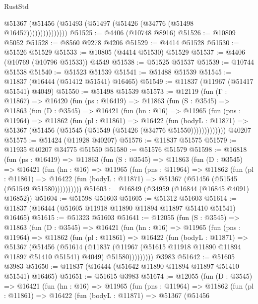 \begin{lexlean}{RustStd}
\begin{coremodule}
{\begin{coremodule}
{{{{{{{{{{{{{{{{{{{{{{{{{{{{{{{{{{{{{{{{{{{{{{{{{{                    @51367 (@51456 (@51493 (@51497 (@51426 (@34776 (@51498 @16457)))))))))))))))
@51525 := @4406 (@10748 @8916)
@51526 := @10809 @5052
@51528 := @8560 @9278 @4206
@51529 := @4414 @51528
@51530 := @51526 @51529
@51533 := @10805 (@4414 @51530) @51529
@51537 := @4406 (@10769 (@10796 @51533)) @4549
@51538 := @51525 @51537
@51539 := @10744 @51538
@51540 := @51523 @51539
@51541 := @51488 @51539
@51545 := @11837 (@16444 (@51412 @51541) @16465)
@51549 := @11837 (@11967 (@51417 @51541) @4049)
@51550 := @51498 @51539
@51573 := @12119
    (fun (Γ : @11867) =>
    @16420
      (fun (ps : @16419) =>
      @11863
        (fun (S : @3545) =>
        @11863
          (fun (D : @3545) =>
          @16421
            (fun (hn : @16) =>
            @11965
              (fun (pns : @11964) =>
              @11862
                (fun (pl : @11861) =>
                @16422
                  (fun (bodyL : @11871) =>
                  @51367 (@51456 (@51545 (@51549 (@51426 (@34776 @51550)))))))))))))
    @40207
@51575 := @51424 (@11928 @40207)
@51576 := @11837 @51575
@51579 := @11935 @40207 @34775 @51550
@51580 := @51576 @51579
@51598 := @16818
    (fun (ps : @16419) =>
    @11863
      (fun (S : @3545) =>
      @11863
        (fun (D : @3545) =>
        @16421
          (fun (hn : @16) =>
          @11965
            (fun (pns : @11964) =>
            @11862
              (fun (pl : @11861) =>
              @16422 (fun (bodyL : @11871) => @51367 (@51456 (@51545 (@51549 @51580))))))))))
@51603 := @16849 (@34959 (@16844 (@16845 @4091) @16852))
@51604 := @51598 @51603
@51605 := @51312 @51603
@51614 := @11837 (@16444 (@51605 @11918 @11890 @11894 @11897 @51410 @51541) @16465)
@51615 := @51323 @51603
@51641 := @12055
    (fun (S : @3545) =>
    @11863
      (fun (D : @3545) =>
      @16421
        (fun (hn : @16) =>
        @11965
          (fun (pns : @11964) =>
          @11862
            (fun (pl : @11861) =>
            @16422
              (fun (bodyL : @11871) =>
              @51367
                (@51456
                  (@51614
                    (@11837
                      (@11967 (@51615 @11918 @11890 @11894 @11897 @51410 @51541) @4049)
                      @51580)))))))))
    @3983
@51642 := @51605 @3983
@51650 := @11837 (@16444 (@51642 @11890 @11894 @11897 @51410 @51541) @16465)
@51651 := @51615 @3983
@51674 := @12055
    (fun (D : @3545) =>
    @16421
      (fun (hn : @16) =>
      @11965
        (fun (pns : @11964) =>
        @11862
          (fun (pl : @11861) =>
          @16422
            (fun (bodyL : @11871) =>
            @51367
              (@51456
}}}}}}}}}}}}}}}}}}}}}}}}}}}}}}}}}}}}}}}}}}}}}}}}}}
\end{coremodule}}
\end{coremodule}
\end{lexlean}
